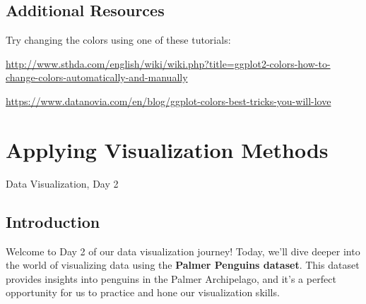 \documentclass[
  letterpaper,
  DIV=11,
  numbers=noendperiod]{scrreprt}
\begin{document}
\section{Additional Resources}\label{additional-resources}

Try changing the colors using one of these tutorials:

\url{http://www.sthda.com/english/wiki/wiki.php?title=ggplot2-colors-how-to-change-colors-automatically-and-manually}

\href{https://www.datanovia.com/en/blog/ggplot-colors-best-tricks-you-will-love/\#:~:text=Change\%20ggplot\%20colors\%20by\%20assigning,or\%20to\%20the\%20fill\%20arguments.}{https://www.datanovia.com/en/blog/ggplot-colors-best-tricks-you-will-love}


\chapter{Applying Visualization
Methods}\label{applying-visualization-methods}

Data Visualization, Day 2

\hfill\break

\section{Introduction}\label{introduction-2}

Welcome to Day 2 of our data visualization journey! Today, we'll dive
deeper into the world of visualizing data using the \textbf{Palmer
Penguins dataset}. This dataset provides insights into penguins in the
Palmer Archipelago, and it's a perfect opportunity for us to practice
and hone our visualization skills.
\end{document}
